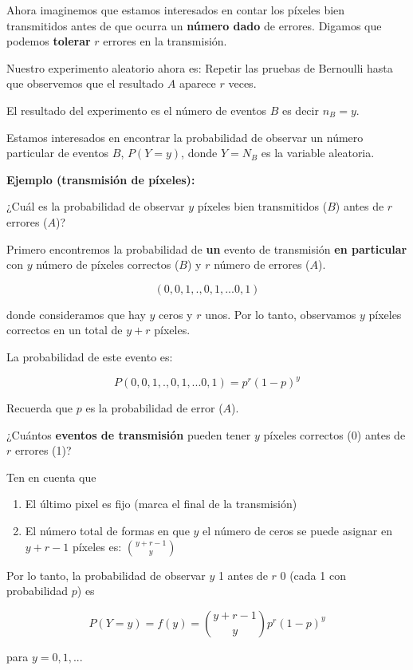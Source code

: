 \documentclass[
]{book}
\begin{document}
Ahora imaginemos que estamos interesados en contar los píxeles bien transmitidos antes de que ocurra un \textbf{número dado} de errores. Digamos que podemos \textbf{tolerar} \(r\) errores en la transmisión.

Nuestro experimento aleatorio ahora es: Repetir las pruebas de Bernoulli hasta que observemos que el resultado \(A\) aparece \(r\) veces.

El resultado del experimento es el número de eventos \(B\) es decir \(n_B=y\).

Estamos interesados en encontrar la probabilidad de observar un número particular de eventos \(B\), \(P(Y=y)\), donde \(Y=N_B\) es la variable aleatoria.

\textbf{Ejemplo (transmisión de píxeles):}

¿Cuál es la probabilidad de observar \(y\) píxeles bien transmitidos (\(B\)) antes de \(r\) errores (\(A\))?

Primero encontremos la probabilidad de \textbf{un} evento de transmisión \textbf{en particular} con \(y\) número de píxeles correctos (\(B\)) y \(r\) número de errores (\(A\)).

\[(0,0,1,., 0,1,...0,1)\]

donde consideramos que hay \(y\) ceros y \(r\) unos. Por lo tanto, observamos \(y\) píxeles correctos en un total de \(y + r\) píxeles.

La probabilidad de este evento es:

\[P(0,0,1,., 0,1,...0,1)=p^r(1-p)^y\]

Recuerda que \(p\) es la probabilidad de error (\(A\)).

¿Cuántos \textbf{eventos de transmisión} pueden tener \(y\) píxeles correctos (0) antes de \(r\) errores (1)?

Ten en cuenta que

\begin{enumerate}
\def\labelenumi{\arabic{enumi})}
\item
  El último pixel es fijo (marca el final de la transmisión)
\item
  El número total de formas en que \(y\) el número de ceros se puede asignar en \(y + r-1\) píxeles es: \(\binom {y + r-1} y\)
\end{enumerate}

Por lo tanto, la probabilidad de observar \(y\) 1 antes de \(r\) 0 (cada 1 con probabilidad \(p\)) es

\[P(Y=y)=f(y)=\binom {y+r-1} yp^r(1-p)^y\]

para \(y=0,1,...\)
\end{document}
